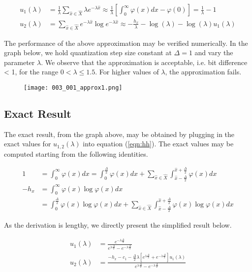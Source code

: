 \begin{align} u_1(\lambda) &= \frac{1}{\lambda} \sum_{\hat{x} \in \hat{X}} \lambda e^{-\lambda\hat{x}} \approx   \frac{1}{\lambda} \left[ \int_{0}^{\infty} \varphi(x) dx - \varphi(0) \right] = \frac{1}{\lambda} - 1\\ u_2(\lambda) &= \sum_{\hat{x} \in \hat{X}} e^{-\lambda\hat{x}} \log e^{-\lambda\hat{x}} \approx -\frac{h_x}{\lambda} - \log(\lambda)  - \log(\lambda) u_1(\lambda)\end{align}

The performance of the above approximation may be verified numerically. In the graph below, we hold quantization step size constant at $\Delta = 1$ and vary the parameter $\lambda$. We observe that the approximation is acceptable, i.e. bit difference < 1, for the range $0 < \lambda \leq 1.5$. For higher values of $\lambda$, the approximation fails.

\begin{figure}[H]
	\centering
	\texttt{[image: 003\_001\_approx1.png]}
\end{figure}

\subsection{Exact Result}

The exact result, from the graph above, may be obtained by plugging in the exact values for $u_{1,2}(\lambda)$ into equation (\ref{eqn:hh}). The exact values may be computed starting from the following identities.

\begin{align} 1 &= \int_{0}^{\infty} \varphi(x) dx = \int_{0}^{\frac{\Delta}{2}} \varphi(x) dx + \sum_{\hat{x} \in \hat{X}} \int_{\hat{x} - \frac{\Delta}{2}}^{\hat{x} + \frac{\Delta}{2}} \varphi(x) dx \\ -h_x &= \int_{0}^{\infty} \varphi(x) \log \varphi(x) dx \nonumber \\ &= \int_{0}^{\frac{\Delta}{2}} \varphi(x) \log \varphi(x) dx + \sum_{\hat{x} \in \hat{X}} \int_{\hat{x} - \frac{\Delta}{2}}^{\hat{x} + \frac{\Delta}{2}} \varphi(x) \log \varphi(x) dx\end{align}

As the derivation is lengthy, we directly present the simplified result below.

\begin{align} u_1(\lambda) &= \frac{e^{-\lambda\frac{\Delta}{2}}}{e^{\lambda\frac{\Delta}{2}} - e^{-\lambda\frac{\Delta}{2}}} \\ u_2(\lambda) &= \frac{-h_x - c_1  - \frac{\Delta}{2}\lambda  \left[e^{\lambda\frac{\Delta}{2}} + e^{-\lambda\frac{\Delta}{2}}\right] u_1(\lambda)}{e^{\lambda\frac{\Delta}{2}} - e^{-\lambda\frac{\Delta}{2}}}\end{align}

